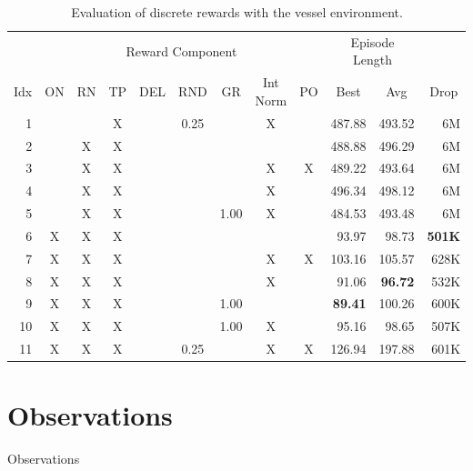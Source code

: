 \begin{table}[htp]
    \begin{center}
        \begin{tabular}{rccccccccrrr}
            \toprule
             & \multicolumn{8}{c}{Reward Component} & \multicolumn{2}{c}{Episode Length} & \\
            \cmidrule(lr){2-9}\cmidrule(lr){10-11}
            \multicolumn{1}{c}{Idx} & \multicolumn{1}{c}{ON} & \multicolumn{1}{c}{RN} & \multicolumn{1}{c}{TP} & \multicolumn{1}{c}{DEL} & \multicolumn{1}{c}{RND} & \multicolumn{1}{c}{GR} & \multicolumn{1}{c}{Int Norm} & \multicolumn{1}{c}{PO} & \multicolumn{1}{c}{Best} & \multicolumn{1}{c}{Avg} & \multicolumn{1}{c}{Drop}\\
            \midrule
            1 &  &  & X &  & 0.25 &  & X &  & 487.88 & 493.52 & 6M \\
            2 &  & X & X &  &  &  &  &  & 488.88 & 496.29 & 6M \\
            3 &  & X & X &  &  &  & X & X & 489.22 & 493.64 & 6M \\
            4 &  & X & X &  &  &  & X &  & 496.34 & 498.12 & 6M \\
            5 &  & X & X &  &  & 1.00 & X &  & 484.53 & 493.48 & 6M \\
            6 & X & X & X &  &  &  &  &  & 93.97 & 98.73 & \textbf{501K} \\
            7 & X & X & X &  &  &  & X & X & 103.16 & 105.57 & 628K \\
            8 & X & X & X &  &  &  & X &  & 91.06 & \textbf{96.72} & 532K \\
            9 & X & X & X &  &  & 1.00 &  &  & \textbf{89.41} & 100.26 & 600K \\
            10 & X & X & X &  &  & 1.00 & X &  & 95.16 & 98.65 & 507K \\
            11 & X & X & X &  & 0.25 &  & X & X & 126.94 & 197.88 & 601K \\
            \bottomrule
        \end{tabular}
    \end{center}
    \caption[Evaluation of Continuous Reward with the Vessel Environment]{Evaluation of discrete rewards with the vessel environment.} \label{tab:VesselMaze02/Reward/Continuous}
\end{table}


\section{Observations} \label{sec:EvalObs}
Observations
